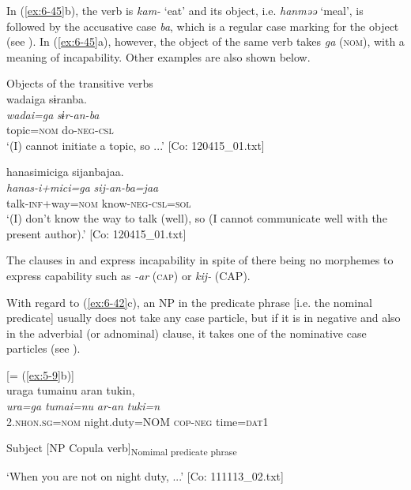 \begin{table}
In (\ref{ex:6-45}b), the verb is \textit{kam-} ‘eat’ and its object, i.e. \textit{hanməə} ‘meal’, is followed by the accusative case \textit{ba}, which is a regular case marking for the object (see ). In (\ref{ex:6-45}a), however, the object of the same verb takes \textit{ga} (\textsc{nom}), with a meaning of incapability. Other examples are also shown below.

\ea\label{ex:6-46}
 Objects of the transitive verbs\\

 \ea {\TM}  {\textbar}wadai{\textbar}ga  sɨranba.\\
\glll \textit{wadai=ga}  \textit{sɨr-an-ba}\\
topic=\textsc{nom}  do-\textsc{neg}-\textsc{csl}\\
\glt ‘(I) cannot initiate a topic, so ...’ [Co: 120415\_01.txt]
\z

\ex {\TM}  hanasimiciga  sijanbajaa.\\
\glll \textit{hanas-i+mici=ga}  \textit{sij-an-ba=jaa}\\
talk-\textsc{inf}+way=\textsc{nom}  know-\textsc{neg}-\textsc{csl}=\textsc{sol}\\
\glt ‘(I) don’t know the way to talk (well), so (I cannot communicate well with the present author).’ [Co: 120415\_01.txt]
\z

The clauses in  and  express incapability in spite of there being no morphemes to express capability such as \textit{-ar} (\textsc{cap}) or \textit{kij-} (CAP).

  With regard to (\ref{ex:6-42}c), an NP in the predicate phrase [i.e. the nominal predicate] usually does not take any case particle, but if it is in negative and also in the adverbial (or adnominal) clause, it takes one of the nominative case particles (see ).

\ea\label{ex:6-47}
 [= (\ref{ex:5-9}b)]\\

{\TM}
\glll uraga  tumainu  aran  tukin,\\
\textit{ura=ga}  \textit{tumai=nu}  \textit{ar-an}  \textit{tuki=n}\\

    2.\textsc{nhon}.\textsc{sg}=\textsc{nom}  night.duty=NOM  \textsc{cop}-\textsc{neg}  time=\textsc{dat}1

    Subject  [NP  Copula verb]\textsubscript{Nomimal predicate phrase}  

\glt    ‘When you are not on night duty, ...’ [Co: 111113\_02.txt]
\z


\end{table}
